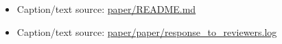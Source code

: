 \begin{itemize}[leftmargin=1.4em,noitemsep]
\item Caption/text source: \begingroup\scriptsize\url{paper/README.md}\endgroup
\item Caption/text source: \begingroup\scriptsize\url{paper/paper/response_to_reviewers.log}\endgroup
\end{itemize}
